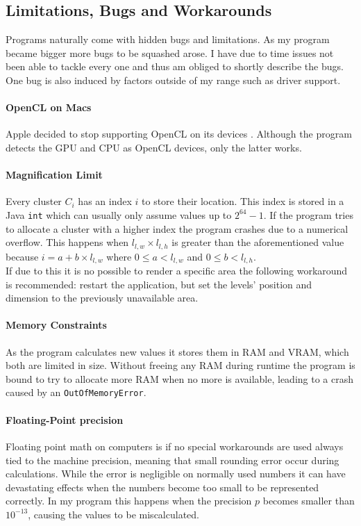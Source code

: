 \documentclass[12pt,a4paper,titlepage]{article}
\begin{document}
	\subsection{Limitations, Bugs and Workarounds}
	Programs naturally come with hidden bugs and limitations. As my program became bigger more bugs to be squashed arose. I have due to time issues not been able to tackle every one and thus am obliged to shortly describe the bugs. One bug is also induced by factors outside of my range such as driver support.
	\paragraph{OpenCL on Macs}
	Apple decided to stop supporting OpenCL on its devices \cite{appleinsider}. Although the program detects the GPU and CPU as OpenCL devices, only the latter works.
	\paragraph{Magnification Limit}
	Every cluster \(C_i\) has an index \(i\) to store their location. This index is stored in a Java \verb|int| which can usually only assume values up to \(2^{64} - 1\). If the program tries to allocate a cluster with a higher index the program crashes due to a numerical overflow. This happens when \(l_{l,w} \times l_{l,h}\) is greater than the aforementioned value because \(i = a + b \times l_{l,w}\) where \(0 \leq a < l_{l,w}\) and \(0 \leq b < l_{l,h}\).\\
	If due to this it is no possible to render a specific area the following workaround is recommended: restart the application, but set the levels' position and dimension to the previously unavailable area.
	\paragraph{Memory Constraints}\label{sec:memory_problem}
	As the program calculates new values it stores them in RAM and VRAM, which both are limited in size. Without freeing any RAM during runtime the program is bound to try to allocate more RAM when no more is available, leading to a crash caused by an \verb|OutOfMemoryError|.
	\paragraph{Floating-Point precision}
	Floating point math on computers is if no special workarounds are used always tied to the machine precision, meaning that small rounding error occur during calculations. While the error is negligible on normally used numbers it can have devastating effects when the numbers become too small to be represented correctly. In my program this happens when the precision \(p\) becomes smaller than \(10^{-13}\), causing the values to be miscalculated.
\end{document}
